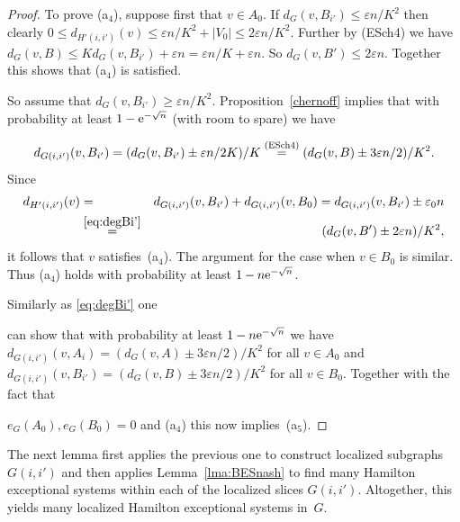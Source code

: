 \documentclass{memo-l}
\def\COMMENT#1{}
\def\eps{\varepsilon}
\numberwithin{section}{chapter}
\numberwithin{equation}{section}
\numberwithin{firstthm}{section}
\numberwithin{figure}{section}
\begin{document}
\begin{proof}
To prove (a$_4$), suppose first that $v\in A_0$. If $d_G(v,B_{i'}) \leq  \eps n/K^2$ then
clearly $0 \leq d_{H'(i,i')} (v)  \leq  \eps n/K^2+ |V_0| \leq 2 \eps n/K^2$.
Further by (ESch4) we have
$d_G(v,B) \leq K d_G(v,B_{i'}) +\eps n =\eps n/K +\eps n.$
So $d_G(v,B') \leq 2 \eps n$.
Together this shows that (a$_4$) is satisfied.


So assume that $d_G(v,B_{i'}) \geq  \eps n/K^2$.
 Proposition~\ref{chernoff}  implies that with probability at least $1-{\rm e}^{-\sqrt{n}}$ (with room to spare) we have%
    \COMMENT{Daniela: added (ESch4) as stackrel}
\begin{equation}\label{eq:degBi'}
d_{G(i,i')}(v,B_{i'} )=(d_{G}(v,B_{i'})\pm \eps n/2K)/K \stackrel{{\rm (ESch4)}}{=}( d_G(v,B) \pm 3\eps n/2 ) / K^2.
\end{equation}
Since
\begin{eqnarray*}
d_{H'(i,i')}(v ) & = & d_{G(i,i')}(v,B_{i'} )+d_{G(i,i')}(v,B_0 )= d_{G(i,i')}(v,B_{i'} )\pm \eps_0 n\\
& \stackrel{\eqref{eq:degBi'}}{=} & (d_{G}(v,B' )\pm 2\eps n)/K^2,
\end{eqnarray*}
it follows that $v$ satisfies~(a$_4$). The argument for the case when $v\in B_0$ is similar.
Thus (a$_4$) holds with probability at least  $1-n {\rm e}^{-\sqrt{n}}$.

Similarly as \eqref{eq:degBi'} one%
    \COMMENT{Note that \eqref{eq:degBi'} trivially holds for vertices $v$ with $d_G(v,B_{i'})< 3\eps n/2K^2$.}
can show that with probability at least  $1-n {\rm e}^{-\sqrt{n}}$ we have
$d_{G(i,i')}(v,A_{i} )= ( d_G(v,A) \pm 3\eps n/2 ) / K^2$ for all $v\in A_0$ and
$d_{G(i,i')}(v,B_{i'} ) =( d_G(v,B) \pm 3\eps n/2) / K^2$ for all $v\in B_0$.
Together with the fact that%
   \COMMENT{Daniela: previously had $|V_0|\le \eps_0 n$ instead of $e_G(A_0), e_G(B_0)=0$ here. Both are correct, but perhaps the
first is a little misleading}
$e_G(A_0), e_G(B_0)=0$ and (a$_4$) this now implies~(a$_5$). 
\end{proof}

The next lemma first applies the previous one to construct localized subgraphs $G(i,i')$ and then applies 
Lemma~\ref{lma:BESnash} to find many Hamilton exceptional systems within each of the localized slices $G(i,i')$.
Altogether, this yields many localized Hamilton exceptional systems in~$G$.
\end{document}
